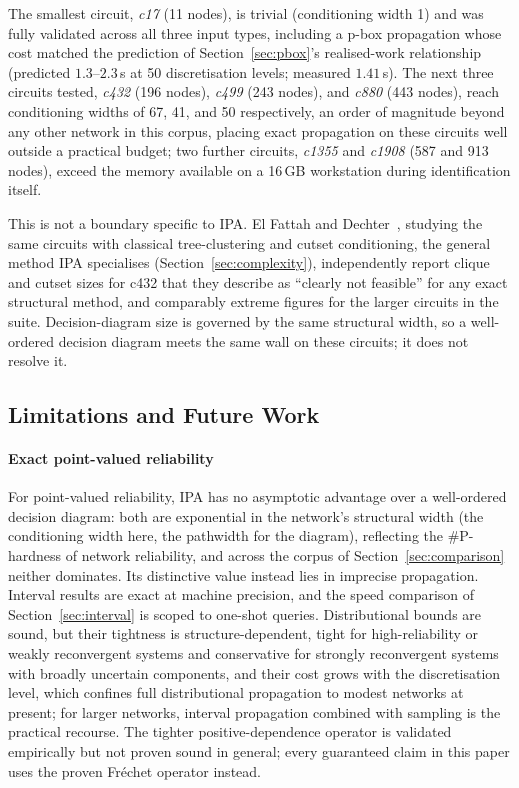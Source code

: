 \documentclass[preprint,12pt]{elsarticle}
\begin{document}
The smallest circuit, \emph{c17} (11 nodes), is trivial (conditioning width 1) and was fully validated across all three input types, including a p-box propagation whose cost matched the prediction of Section~\ref{sec:pbox}'s realised-work relationship (predicted $1.3$--$2.3$\,s at 50 discretisation levels; measured $1.41$\,s). The next three circuits tested, \emph{c432} (196 nodes), \emph{c499} (243 nodes), and \emph{c880} (443 nodes), reach conditioning widths of 67, 41, and 50 respectively, an order of magnitude beyond any other network in this corpus, placing exact propagation on these circuits well outside a practical budget; two further circuits, \emph{c1355} and \emph{c1908} (587 and 913 nodes), exceed the memory available on a 16\,GB workstation during identification itself.

This is not a boundary specific to IPA. El Fattah and Dechter~\cite{elfattah_diagnosing_1996}, studying the same circuits with classical tree-clustering and cutset conditioning, the general method IPA specialises (Section~\ref{sec:complexity}), independently report clique and cutset sizes for c432 that they describe as ``clearly not feasible'' for any exact structural method, and comparably extreme figures for the larger circuits in the suite. Decision-diagram size is governed by the same structural width, so a well-ordered decision diagram meets the same wall on these circuits; it does not resolve it.

\subsection{Limitations and Future Work}\label{sec:limitations}

\paragraph{Exact point-valued reliability} For point-valued reliability, IPA has no asymptotic advantage over a well-ordered decision diagram: both are exponential in the network's structural width (the conditioning width here, the pathwidth for the diagram), reflecting the \#P-hardness of network reliability, and across the corpus of Section~\ref{sec:comparison} neither dominates. Its distinctive value instead lies in imprecise propagation. Interval results are exact at machine precision, and the speed comparison of Section~\ref{sec:interval} is scoped to one-shot queries. Distributional bounds are sound, but their tightness is structure-dependent, tight for high-reliability or weakly reconvergent systems and conservative for strongly reconvergent systems with broadly uncertain components, and their cost grows with the discretisation level, which confines full distributional propagation to modest networks at present; for larger networks, interval propagation combined with sampling is the practical recourse. The tighter positive-dependence operator is validated empirically but not proven sound in general; every guaranteed claim in this paper uses the proven Fr\'echet operator instead.
\end{document}
